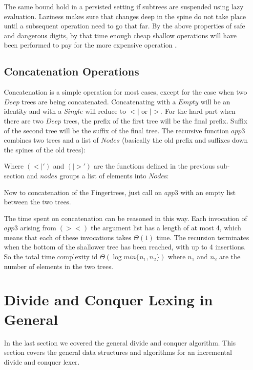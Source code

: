 The same bound hold in a persisted setting if subtrees are suspended using lazy
evaluation. Laziness makes sure that changes deep in the spine do not take place
until a subsequent operation need to go that far. By the above properties
of safe and dangerous digits, by that time enough cheap shallow operations
will have been performed to pay for the more expensive operation \cite{fingertree}.

\subsection{Concatenation Operations}
Concatenation is a simple operation for most cases, except for the case when two $Deep$ trees are being concatenated. Concatenating with a $Empty$ will be an identity and with a $Single$ will reduce to $<|$ or $|>$. For the hard part when there are two $Deep$ trees, the prefix of the first tree will be the final prefix. Suffix of the second tree will be the suffix of the final tree. The recursive function $app3$ combines two trees and a list of $Nodes$ (basically the old prefix and suffixes down the spines of the old trees):



Where $(<|')$ and $(|>')$ are the functions defined in the previous sub-section and $nodes$ groups a list of elements into $Node$s: 



Now to concatenation of the Fingertrees, just call on $app3$ with an empty list between the two trees.



The time spent on concatenation can be reasoned in this way. Each invocation of $app3$ arising from $(><)$ the argument list has a length of at most 4, which means that each of these invocations takes $\Theta(1)$ time. The recursion terminates when the bottom of the shallower tree has been reached, with up to 4 insertions. So the total time complexity id $\Theta(\log min\{n_1, n_2\})$ where $n_1$ and $n_2$ are the number of elements in the two trees. 

\section{Divide and Conquer Lexing in General}
In the last section we covered the general divide and conquer algorithm. This
section covers the general data structures and algorithms for an incremental
divide and conquer lexer.

